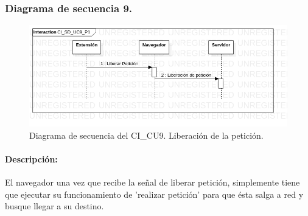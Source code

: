\documentclass[12pt, a4paper, titlepage]{report}
\begin{document}
    			\subsubsection{Diagrama de secuencia 9.}
        			\begin{figure}[H]
        				\begin{center}    		    	\includegraphics[width=15cm]{./imagenes/Disenio/Componente_1/CI_SD_UC9_P1.png}
        				\caption[Diagrama de secuencia 9 del Componente I]{Diagrama de secuencia del CI\_CU9. Liberación de la petición.}
        				\end{center}
        			\end{figure}
        		
        		    \paragraph{Descripción:}
        		    El navegador una vez que recibe la señal de liberar petición, simplemente tiene que ejecutar su funcionamiento de 'realizar petición' para que ésta salga a red y busque llegar a su destino.
    		
\end{document}
